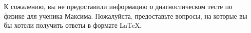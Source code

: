 \documentclass{article}
\begin{document}
К сожалению, вы не предоставили информацию о диагностическом тесте по физике для ученика Максима. Пожалуйста, предоставьте вопросы, на которые вы бы хотели получить ответы в формате LaTeX.
\end{document}
